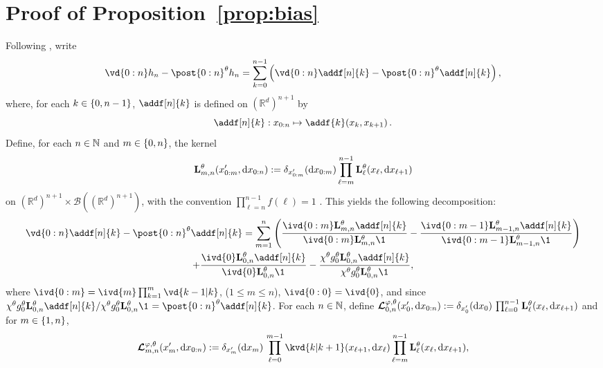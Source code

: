 \documentclass{article}
\begin{document}
\section{Proof of Proposition~\ref{prop:bias}}
\label{sec:proof}
Following \cite{gloaguen2022pseudo}, write 
$$
\vd{0:n} h_n - \post{0:n}^\parvec h_n = \sum_{k = 0}^{n - 1} \left( \vd{0:n} \addf[n]{k} - \post{0:n}^\parvec \addf[n]{k} \right), 
$$
where, for each $k \in \{ 0, n - 1 \}$, $\addf[n]{k}$ is defined on $(\mathbb{R}^d)^{n+1}$ by
\begin{equation} \label{eq:def:addf}
\addf[n]{k} :  x_{0:n} \mapsto \addf{k}(x_k, x_{k + 1})\,. 
\end{equation}
Define, for each $n \in \mathbb{N}$ and $m \in \{ 0, n \}$, the kernel 
\begin{equation} \label{eq:def:uk:products}
    \mathbf{L}_{m, n}^{\theta}(x_{0:m}', \mathrm{d} x_{0:n}) := \delta_{x_{0:m}'}(\mathrm{d} x_{0:m}) \prod_{\ell = m}^{n - 1} \mathbf{L}_{\ell}^{\theta}(x_\ell, \mathrm{d} x_{\ell + 1}) 
\end{equation}
on $(\mathbb{R}^d)^{n + 1} \times \mathcal{B}((\mathbb{R}^d)^{n + 1})$, with the convention $\prod_{\ell = n}^{n - 1} f(\ell) = 1$ .  This yields the following decomposition:
\begin{multline*}
\vd{0:n} \addf[n]{k} - \post{0:n}^\parvec \addf[n]{k} = 
\sum_{m = 1}^n 
\left( 
\frac{\ivd{0:m} \uk{m, n}{\parvec} \addf[n]{k}}{\ivd{0:m} \uk{m, n}{\parvec} \1_{}}
- \frac{\ivd{0:m - 1} \uk{m - 1, n}{\parvec} \addf[n]{k}}{\ivd{0:m - 1} \uk{m - 1, n}{\parvec} \1_{}} 
\right) \\ 
+ \frac{\ivd{0} \uk{0, n}{\parvec} \addf[n]{k}}{\ivd{0} \uk{0, n}{\parvec} \1_{}}
- \frac{\chi^\parvec \md{0}{\parvec}\uk{0, n}{\parvec} \addf[n]{k}}{\chi^\parvec\md{0}{\parvec}\uk{0, n}{\parvec} \1_{}},
\end{multline*}
where $\ivd{0:m} = \ivd{m}\prod_{k=1}^m\vd{k - 1\vert k}$, ($1\leq m \leq n$), $\ivd{0:0} = \ivd{0} $, and since $\chi^\parvec \md{0}{\parvec} \uk{0, n}{\parvec} \addf[n]{k}/\chi^\parvec\md{0}{\parvec}\uk{0, n}{\parvec} \1_{} = \post{0:n}^\parvec \addf[n]{k}$.  For each $n \in \mathbb{N}$, define  $\boldsymbol{\mathcal{L}}^{\varphi,\theta}_{0, n}(x_0', \mathrm{d} x_{0:n}) := \delta_{x_0'}(\mathrm{d} x_0) \,  \prod_{\ell = 0}^{n - 1} \mathbf{L}_{\ell}^{\theta}(x_\ell, \mathrm{d} x_{\ell + 1})$ and for $m \in \{ 1, n \}$, 
\begin{equation} \label{eq:def:retrokmod}
    \retrokmod_{m, n}(x_m', \rmd x_{0:n}) \eqdef \delta_{x_m'}(\rmd x_m) \, \prod_{\ell = 0}^{m - 1} \kvd{k \vert k+1}(x_{\ell + 1}, \rmd x_\ell) \prod_{\ell = m}^{n - 1} \uk{\ell}{\parvec}(x_\ell, \rmd x_{\ell + 1}), 
\end{equation}
\end{document}
